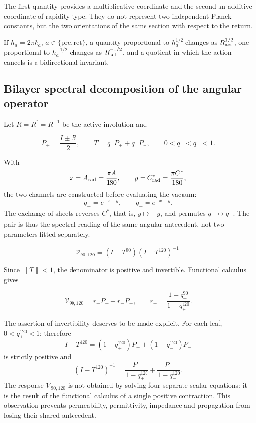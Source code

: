 The first quantity provides a multiplicative coordinate and the second
an additive coordinate of rapidity type. They do not represent two independent
Planck constants, but the two orientations of the same section
with respect to the return.

If \(h_a=2\pi\hbar_a\), \(a\in\{\mathrm{pre},\mathrm{ret}\}\), a quantity proportional to \(h_a^{1/2}\) changes as \(R_{\rm act}^{1/2}\), one proportional to \(h_a^{-1/2}\) changes as \(R_{\rm act}^{-1/2}\), and a quotient in which the action cancels is a bidirectional invariant.

\subsection{Bilayer spectral decomposition of the angular operator}

Let \(R=R^*=R^{-1}\) be the active involution and

\[
P_\pm=\frac{I\pm R}{2},
\qquad
T=q_+P_+ +q_-P_-,
\qquad 0<q_+<q_-<1.
\]

With
\[
x=A_{\rm rad}=\frac{\pi A}{180},\qquad
y=C^*_{\rm rad}=\frac{\pi C^*}{180},
\]
the two channels are constructed before evaluating the vacuum:
\begin{equation}
q_+=e^{-x-y},\qquad q_-=e^{-x+y}.
\label{p12-83-c13-s1:eq:vacuum-angular-channels}
\end{equation}
The exchange of sheets reverses \(C^*\), that is, \(y\mapsto-y\), and permutes \(q_+\leftrightarrow q_-\). The pair is thus the spectral reading of the same angular antecedent, not two parameters fitted separately.

\begin{definition}
\begin{equation}
\mathcal V_{90,120}=(I-T^{90})(I-T^{120})^{-1}.
\label{p12-83-c13-s1:eq:vacuum-operator}
\end{equation}
\end{definition}

Since \(\|T\|<1\), the denominator is positive and invertible. Functional calculus gives

\begin{equation}
\mathcal V_{90,120}=r_+P_+ +r_-P_-,
\qquad
r_\pm=\frac{1-q_\pm^{90}}{1-q_\pm^{120}}.
\label{p12-83-c13-s1:eq:vacuum-eigenvalues}
\end{equation}

The assertion of invertibility deserves to be made explicit. For each leaf,
\(0<q_\pm^{120}<1\); therefore
\[
I-T^{120}=(1-q_+^{120})P_++(1-q_-^{120})P_-
\]
is strictly positive and
\[
(I-T^{120})^{-1}
=\frac{P_+}{1-q_+^{120}}+
 \frac{P_-}{1-q_-^{120}}.
\]
The response \(\mathcal V_{90,120}\) is not obtained by solving four
separate scalar equations: it is the result of the functional calculus of a
single positive contraction. This observation prevents permeability,
permittivity, impedance and propagation from losing their shared antecedent.

